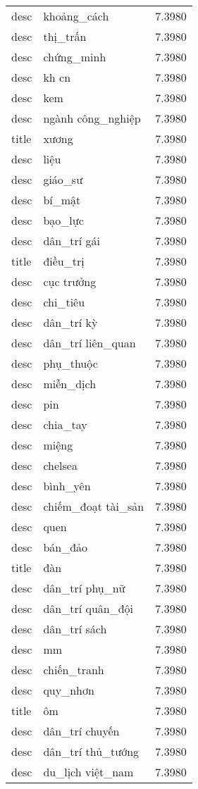 \documentclass{article}
\begin{document}
\begin{tabular}{lll}
desc & khoảng\_cách & 7.3980\\
desc & thị\_trấn & 7.3980\\
desc & chứng\_minh & 7.3980\\
desc & kh cn & 7.3980\\
desc & kem & 7.3980\\
desc & ngành công\_nghiệp & 7.3980\\
title & xương & 7.3980\\
desc & liệu & 7.3980\\
desc & giáo\_sư & 7.3980\\
desc & bí\_mật & 7.3980\\
desc & bạo\_lực & 7.3980\\
desc & dân\_trí gái & 7.3980\\
title & điều\_trị & 7.3980\\
desc & cục trưởng & 7.3980\\
desc & chi\_tiêu & 7.3980\\
desc & dân\_trí kỳ & 7.3980\\
desc & dân\_trí liên\_quan & 7.3980\\
desc & phụ\_thuộc & 7.3980\\
desc & miễn\_dịch & 7.3980\\
desc & pin & 7.3980\\
desc & chia\_tay & 7.3980\\
desc & miệng & 7.3980\\
desc & chelsea & 7.3980\\
desc & bình\_yên & 7.3980\\
desc & chiếm\_đoạt tài\_sản & 7.3980\\
desc & quen & 7.3980\\
desc & bán\_đảo & 7.3980\\
title & đàn & 7.3980\\
desc & dân\_trí phụ\_nữ & 7.3980\\
desc & dân\_trí quân\_đội & 7.3980\\
desc & dân\_trí sách & 7.3980\\
desc & mm & 7.3980\\
desc & chiến\_tranh & 7.3980\\
desc & quy\_nhơn & 7.3980\\
title & ôm & 7.3980\\
desc & dân\_trí chuyến & 7.3980\\
desc & dân\_trí thủ\_tướng & 7.3980\\
desc & du\_lịch việt\_nam & 7.3980\\

\end{tabular}
\end{document}
